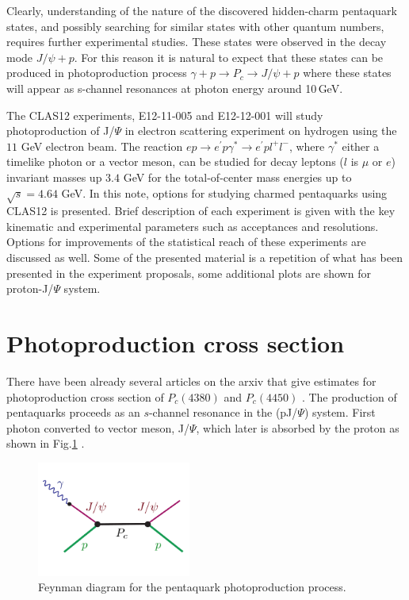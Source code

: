 \documentclass[12pt]{revtex4}
\begin{document}
Clearly, understanding of the nature of the discovered hidden-charm pentaquark states, and possibly searching for similar states with other quantum numbers, requires further experimental studies. 
These states were observed in the decay mode $J/\psi+p$. For this reason it is natural to expect that these states can be produced in photoproduction process $\gamma+p\to P_c\to J/\psi+p$ where these states will appear as s-channel resonances at photon energy around 10\,GeV. 

The CLAS12 experiments, E12-11-005 and E12-12-001 \cite{e1211005, e1212001} will study photoproduction of J/$\Psi$ in electron scattering experiment on hydrogen using the $11$ GeV electron beam. The reaction $e p\to e^\prime p \gamma^* \to e^\prime p l^+ l^- $, where $\gamma^*$ either a timelike photon or a vector meson, can be studied for decay leptons ($l$ is $\mu$ or $e$) invariant masses up $3.4$ GeV for the total-of-center mass energies up to $\sqrt{s}=4.64$ GeV.    
In this note, options for studying charmed pentaquarks using CLAS12 is presented. Brief description of each experiment is given with the key kinematic and experimental parameters such as acceptances and resolutions. Options for improvements of the statistical reach of these experiments are discussed as well. Some of the presented material is a repetition of what has been presented in the experiment proposals, some additional plots are shown for proton-J/$\Psi$ system.

\section{Photoproduction cross section}

There have been already several articles on the arxiv that give estimates for photoproduction cross section of $P_c(4380)$ and $P_c(4450)$ \cite{pt1, pt2, pt3}. The production of pentaquarks proceeds as an $s$-channel resonance in the (pJ/$\Psi$) system. First photon converted to vector meson, J/$\Psi$, which later is absorbed by the proton as shown in Fig.\ref{fig:fndiag} \cite{pt4}.

\begin{figure}[ht]
\begin{center}
\includegraphics[width=0.45\textwidth]{Jipsi5.pdf}
\caption{Feynman diagram for the pentaquark photoproduction process.}    
\label{fig:fndiag}
\end{center}
\end{figure} 
\end{document}
